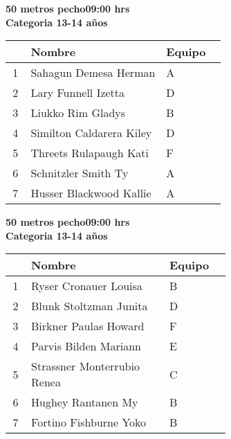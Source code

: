 \begin{minipage}{0.95\linewidth}\vspace{0.5cm} 
\begin{flushleft}
\textbf{
\hspace{-0.15cm}50 metros pecho\hspace{1.5cm}09:00 hrs \\Categoria 13-14 años}\vspace{-0.2cm} 
\end{flushleft}
\begin{tabular}{cp{0.63\linewidth}l}
\hline
& \textbf{Nombre} & \textbf{Equipo} \\ \hline
1 & Sahagun Demesa Herman & A \\ 
2 & Lary Funnell Izetta & D \\ 
3 & Liukko Rim Gladys & B \\ 
4 & Similton Caldarera Kiley & D \\ 
5 & Threets Rulapaugh Kati & F \\ 
6 & Schnitzler Smith Ty & A \\ 
7 & Husser Blackwood Kallie & A \\ 
\end{tabular}
\end{minipage}
\begin{minipage}{0.95\linewidth}\vspace{0.5cm} 
\begin{flushleft}
\textbf{
\hspace{-0.15cm}50 metros pecho\hspace{1.5cm}09:00 hrs \\Categoria 13-14 años}\vspace{-0.2cm} 
\end{flushleft}
\begin{tabular}{cp{0.63\linewidth}l}
\hline
& \textbf{Nombre} & \textbf{Equipo} \\ \hline
1 & Ryser Cronauer Louisa & B \\ 
2 & Blunk Stoltzman Junita & D \\ 
3 & Birkner Paulas Howard & F \\ 
4 & Parvis Bilden Mariann & E \\ 
5 & Strassner Monterrubio Renea & C \\ 
6 & Hughey Rantanen My & B \\ 
7 & Fortino Fishburne Yoko & B \\ 
\end{tabular}
\end{minipage}

